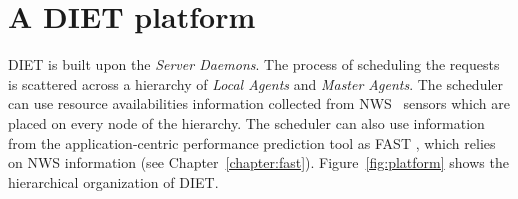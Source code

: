 
\chapter{A DIET platform}
\label{ch:description}

\textsc{DIET} is built upon the \emph{Server Daemons}. The process of
scheduling the requests is scattered across a hierarchy of \emph{Local
Agents} and \emph{Master Agents}. The scheduler can use resource
availabilities information collected from NWS~\cite{WSH99} sensors
which are placed on every node of the hierarchy. The scheduler can
also use information from the application-centric performance
prediction tool as \textsc{FAST} \cite{Qui02}, which relies on NWS
information (see
Chapter~\ref{chapter:fast}). Figure~\ref{fig:platform} shows the
hierarchical organization of DIET.

